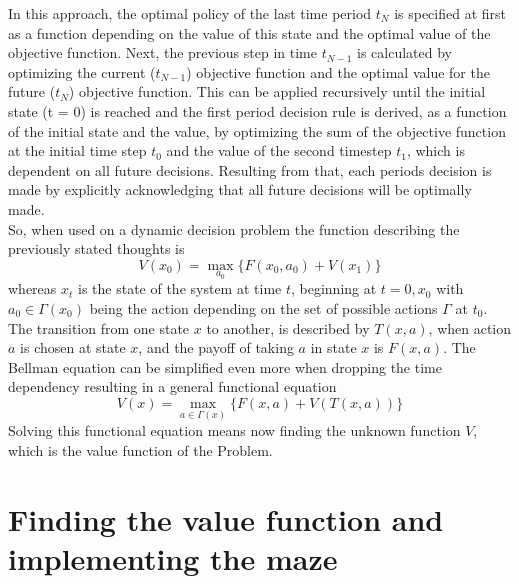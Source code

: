 \documentclass[conference]{IEEEtran}
\begin{document}
In this approach, the optimal policy of the last time period $t_N$ is specified at first as a function depending on the value of this state and the optimal value of the objective function.
Next, the previous step in time $t_{N-1}$ is calculated by optimizing the current ($t_{N-1}$) objective function and the optimal value for the future ($t_{N}$) objective function. This can be applied recursively until the initial state (t = 0) is reached and the first period decision rule is derived, as a function of the initial state and the value, by optimizing the sum of the objective function at the initial time step $t_{0}$ and the value of the second timestep $t_{1}$, which is dependent on all future decisions. Resulting from that, each periods decision is made by explicitly acknowledging that all future decisions will be optimally made.\\
So, when used on a dynamic decision problem the function describing the previously stated thoughts is
\begin{equation}
V(x_0) = \max_{a_0} \{F(x_0, a_0) + V(x_1)\}
\end{equation}
whereas $x_t$ is the state of the system at time $t$, beginning at $t = 0, x_0$ with
$a_0 \in \Gamma(x_0)$ being the action depending on the set of possible actions $\Gamma$ at $t_0$.
The transition from one state $x$ to another, is described by $T(x,a)$, when action $a$ is chosen at state $x$, and the payoff of taking $a$ in state $x$ is $F(x,a)$.
The Bellman equation can be simplified even more when dropping the time dependency resulting in a general functional equation
\begin{equation}
V(x) = \max_{a \in \Gamma(x)} \{F(x,a) + V(T(x,a))\}
\end{equation}
Solving this functional equation means now finding the unknown function $V$, which is the value function of the Problem. \cite{Bellman.2013}
\\

\section{Finding the value function and implementing the maze}
\end{document}
